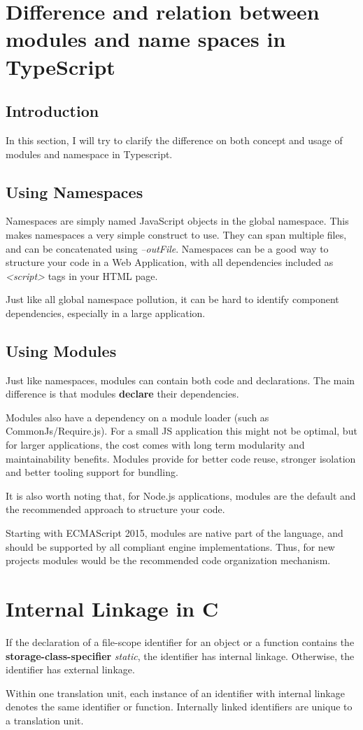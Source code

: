 \documentclass[a4paper]{report}
\begin{document}
\section{Difference and relation between modules and name spaces in TypeScript}
\subsection{Introduction}
In this section, I will try to  clarify the difference on both concept and usage of modules and namespace in Typescript.
\subsection{Using Namespaces}
Namespaces are simply named JavaScript objects in the global namespace. This makes namespaces a very simple construct to use. They can span multiple files, and can be concatenated using \emph{--outFile}. Namespaces can be a good way to structure your code in a Web Application, with all dependencies included as \emph{<script>} tags in your HTML page.
\par
Just like all global namespace pollution, it can be hard to identify component dependencies, especially in a large application.
\subsection{Using Modules}
Just like namespaces, modules can contain both code and declarations. The main difference is that modules \textbf{declare} their dependencies.
\par
Modules also have a dependency on a module loader (such as CommonJs/Require.js). For a small JS application this might not be optimal, but for larger applications, the cost comes with long term modularity and maintainability benefits. Modules provide for better code reuse, stronger isolation and better tooling support for bundling.
\par
It is also worth noting that, for Node.js applications, modules are the default and the recommended approach to structure your code.
\par
Starting with ECMAScript 2015, modules are native part of the language, and should be supported by all compliant engine implementations. Thus, for new projects modules would be the recommended code organization mechanism.
\section{Internal Linkage in C}
If the declaration of a file-scope identifier for an object or a function contains the \textbf{storage-class-specifier} \emph{static}, the identifier has internal linkage. Otherwise, the identifier has external linkage. 
\par
Within one translation unit, each instance of an identifier with internal linkage denotes the same identifier or function. Internally linked identifiers are unique to a translation unit.
\end{document}
